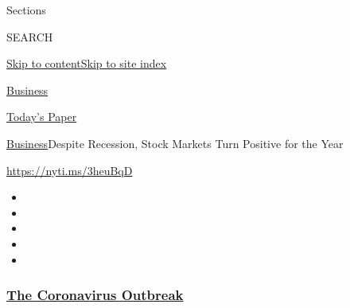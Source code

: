 Sections

SEARCH

\protect\hyperlink{site-content}{Skip to
content}\protect\hyperlink{site-index}{Skip to site index}

\href{https://www.nytimes3xbfgragh.onion/section/business}{Business}

\href{https://myaccount.nytimes3xbfgragh.onion/auth/login?response_type=cookie\&client_id=vi}{}

\href{https://www.nytimes3xbfgragh.onion/section/todayspaper}{Today's
Paper}

\href{/section/business}{Business}\textbar{}Despite Recession, Stock
Markets Turn Positive for the Year

\url{https://nyti.ms/3heuBqD}

\begin{itemize}
\item
\item
\item
\item
\item
\end{itemize}

\hypertarget{the-coronavirus-outbreak}{%
\subsubsection{\texorpdfstring{\href{https://www.nytimes3xbfgragh.onion/news-event/coronavirus?name=styln-coronavirus-markets\&region=TOP_BANNER\&block=storyline_menu_recirc\&action=click\&pgtype=Article\&impression_id=ed062330-f52c-11ea-a3d9-4be88c42bbf1\&variant=undefined}{The
Coronavirus
Outbreak}}{The Coronavirus Outbreak}}\label{the-coronavirus-outbreak}}

